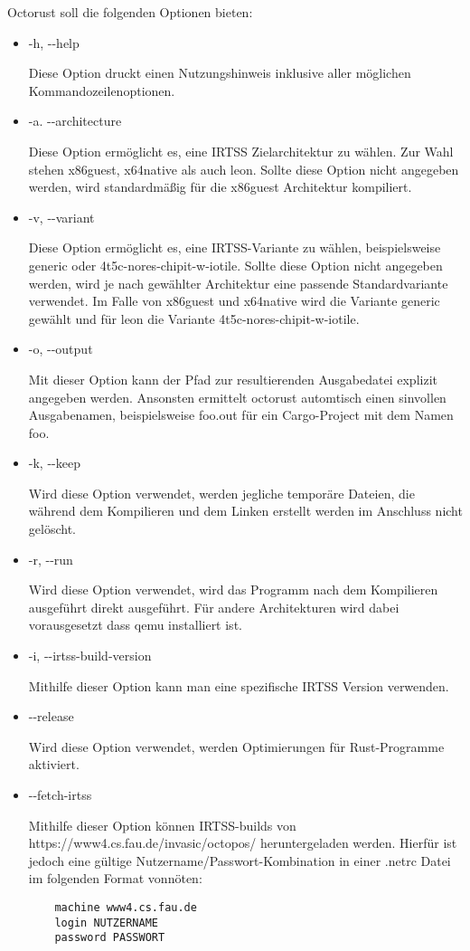 Octorust soll die folgenden Optionen bieten:
\begin{itemize}

	\item{-h, -{}-help}
	
	Diese Option druckt einen Nutzungshinweis inklusive aller möglichen Kommandozeilenoptionen.
	
	\item{-a. -{}-architecture}
	
	Diese Option ermöglicht es, eine IRTSS Zielarchitektur zu wählen. Zur Wahl stehen x86guest, x64native als auch leon.
	Sollte diese Option nicht angegeben werden, wird standardmäßig für die x86guest Architektur kompiliert.
	
	\item{-v, -{}-variant}
	
	Diese Option ermöglicht es, eine IRTSS-Variante zu wählen, beispielsweise generic oder 	4t5c-nores-chipit-w-iotile. Sollte diese
	Option nicht angegeben werden, wird je nach gewählter Architektur eine passende Standardvariante verwendet. Im Falle von
	x86guest und x64native wird die Variante generic gewählt und für leon die Variante 4t5c-nores-chipit-w-iotile.
	
	\item{-o, -{}-output}
	
	Mit dieser Option kann der Pfad zur resultierenden Ausgabedatei explizit angegeben	werden. Ansonsten ermittelt octorust
	automtisch einen sinvollen Ausgabenamen, beispielsweise foo.out für ein Cargo-Project mit dem Namen foo.
	
	\item{-k, -{}-keep}
	
	Wird diese Option verwendet, werden jegliche temporäre Dateien, die während dem Kompilieren und dem Linken erstellt werden im
	Anschluss nicht gelöscht.
	
	\item{-r, -{}-run}
	
	Wird diese Option verwendet, wird das Programm nach dem Kompilieren ausgeführt direkt ausgeführt. Für andere Architekturen
	wird dabei vorausgesetzt dass qemu installiert ist.
	
	\item{-i, -{}-irtss-build-version}

	Mithilfe dieser Option kann man eine spezifische IRTSS Version verwenden.
	
	\item{-{}-release}

	Wird diese Option verwendet, werden Optimierungen für Rust-Programme aktiviert.
	
	\item{-{}-fetch-irtss}

	Mithilfe dieser Option können IRTSS-builds von https://www4.cs.fau.de/invasic/octopos/ heruntergeladen werden. Hierfür ist jedoch
	eine gültige Nutzername/Passwort-Kombination in einer .netrc Datei im folgenden Format vonnöten:
	\begin{verbatim}
	machine www4.cs.fau.de
	login NUTZERNAME
	password PASSWORT
	\end{verbatim}
\end{itemize}

